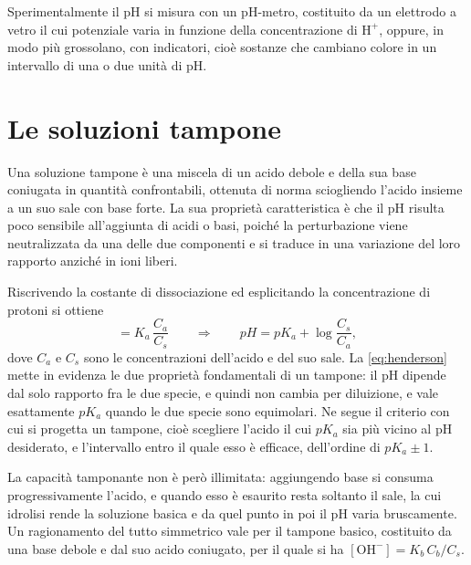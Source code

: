 Sperimentalmente il pH si misura con un pH-metro, costituito da un elettrodo a vetro il cui potenziale varia in funzione della concentrazione di $\mathrm{H^+}$, oppure, in modo più grossolano, con indicatori, cioè sostanze che cambiano colore in un intervallo di una o due unità di pH.

\section{Le soluzioni tampone}
 
Una soluzione tampone è una miscela di un acido debole e della sua base coniugata in quantità confrontabili, ottenuta di norma sciogliendo l'acido insieme a un suo sale con base forte.
La sua proprietà caratteristica è che il pH risulta poco sensibile all'aggiunta di acidi o basi, poiché la perturbazione viene neutralizzata da una delle due componenti e si traduce in una variazione del loro rapporto anziché in ioni liberi.
 
Riscrivendo la costante di dissociazione ed esplicitando la concentrazione di protoni si ottiene
\begin{equation}
    [\mathrm{H^+}] = K_a\,\frac{C_a}{C_s}
    \qquad\Longrightarrow\qquad
    pH = pK_a + \log\frac{C_s}{C_a} ,
    \label{eq:henderson}
\end{equation}
dove $C_a$ e $C_s$ sono le concentrazioni dell'acido e del suo sale.
La \eqref{eq:henderson} mette in evidenza le due proprietà fondamentali di un tampone: il pH dipende dal solo rapporto fra le due specie, e quindi non cambia per diluizione, e vale esattamente $pK_a$ quando le due specie sono equimolari.
Ne segue il criterio con cui si progetta un tampone, cioè scegliere l'acido il cui $pK_a$ sia più vicino al pH desiderato, e l'intervallo entro il quale esso è efficace, dell'ordine di $pK_a \pm 1$.
 
La capacità tamponante non è però illimitata: aggiungendo base si consuma progressivamente l'acido, e quando esso è esaurito resta soltanto il sale, la cui idrolisi rende la soluzione basica e da quel punto in poi il pH varia bruscamente.
Un ragionamento del tutto simmetrico vale per il tampone basico, costituito da una base debole e dal suo acido coniugato, per il quale si ha $[\mathrm{OH^-}] = K_b\,C_b/C_s$.